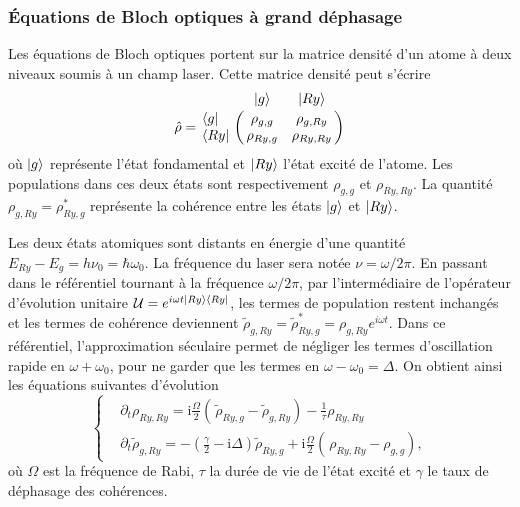 \subsubsection*{Équations de Bloch optiques à grand déphasage}
\noindent Les équations de Bloch optiques portent sur la matrice densité d'un atome à deux niveaux soumis à un champ laser.
Cette matrice densité peut s'écrire
\begin{equation}
\label{eq:density_matrix_Bloch}
\hat{\rho} = \bordermatrix{~ 	&\ket{g} 	& \ket{Ry} \cr
	\bra{g}		&\rho_{g,g}		&\rho_{g,Ry}	\cr 
	\bra{Ry} 		&\rho_{Ry,g}		&\rho_{Ry,Ry} \cr}
\end{equation}
où $\ket{g}$ représente l'état fondamental et $\ket{Ry}$ l'état excité de l'atome.
Les populations dans ces deux états sont respectivement $\rho_{g,g}$ et $\rho_{Ry,Ry}$.
La quantité $\rho_{g,Ry} = \rho_{Ry,g}^*$ représente la cohérence entre les états $\ket{g}$ et $\ket{Ry}$.

Les deux états atomiques sont distants en énergie d'une quantité $E_{Ry}-E_{g} = h\nu_{0} = \hbar\omega_0$.
La fréquence du laser sera notée $\nu =\omega/ 2\pi$.
En passant dans le référentiel tournant à la fréquence $\omega/2\pi$, par l'intermédiaire de l'opérateur d'évolution unitaire $\mathcal{U} = e^{i\omega t \ket{Ry}\bra{Ry}}$, les termes de population restent inchangés et les termes de cohérence deviennent $\tilde{\rho}_{g,Ry} = \tilde{\rho}_{Ry,g}^* =  \rho_{g,Ry}e^{i\omega t}$.
Dans ce référentiel, l'approximation séculaire permet de négliger les termes d'oscillation rapide en $\omega+\omega_0$, pour ne garder que les termes en $\omega-\omega_0 =\Delta$.
On obtient ainsi les équations suivantes d'évolution
\begin{equation}
\label{eq:Bloch_eq}
\left\{
\begin{aligned}
&\partial_t\rho_{Ry,Ry} = \mathrm{i} \frac{\Omega}{2} \left( \frac{}{}\! \tilde{\rho}_{Ry,g} - \tilde{\rho}_{g,Ry} \right) - \frac{1}{\tau}\rho_{Ry,Ry} \\
&\partial_t\tilde{\rho}_{g,Ry} =-\left( \frac{\gamma}{2} - \mathrm{i} \Delta \right) \tilde{\rho}_{Ry,g} + \mathrm{i} \frac{\Omega}{2} \left(\frac{}{}\! \rho_{Ry,Ry} - \rho_{g,g} \right),
\end{aligned}
\right.
\end{equation}
où $\Omega$ est la fréquence de Rabi, $\tau$ la durée de vie de l'état excité et $\gamma$ le taux de déphasage des cohérences.

